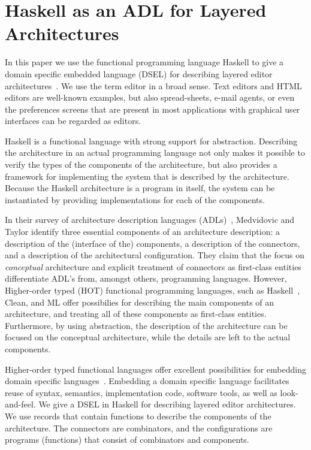 

\chapter{Haskell as an ADL for Layered Architectures}
\label{chap:archCombs}

In this paper we use the functional programming language Haskell to give a domain specific embedded language (DSEL) for describing layered editor architectures~\cite{architecture}. We use the term editor in a broad sense. Text editors and HTML editors are well-known examples, but also spread-sheets, e-mail agents, or even the preferences screens that are present in most applications with graphical user interfaces can be regarded as editors.

 Haskell is a functional language with strong support for abstraction. Describing the architecture in an actual programming language not only makes it possible to verify the types of the components of the architecture, but also provides a framework for implementing the system that is described by the architecture. Because the Haskell architecture is a program in itself, the system can be instantiated by providing implementations for each of the components.

In their survey of architecture description languages (ADLs)~\cite{medvidovicTaylor}, Medvidovic and Taylor identify three essential components of an architecture description: a description of the (interface of the) components, a description of the connectors, and a description of the architectural configuration. They claim that the focus on {\em conceptual} architecture and explicit treatment of connectors as first-class entities differentiate ADL's from, amongst others, programming languages. However, Higher-order typed (HOT) functional programming languages, such as Haskell~\cite{haskel}, Clean, and ML offer possibilies for describing the main components of an architecture, and treating all of these components as first-class entities. Furthermore, by using abstraction, the description of the architecture can be focused on the conceptual architecture, while the details are left to the actual components.

Higher-order typed functional languages offer excellent possibilities for embedding domain specific languages~\cite{hudak}. Embedding a domain specific language facilitates reuse of syntax, semantics, implementation code, software tools, as well as look-and-feel. We give a DSEL in Haskell for describing layered editor architectures. We use records that contain functions to describe the components of the architecture. The connectors are combinators, and the configurations are programs (functions) that consist of combinators and components. 

